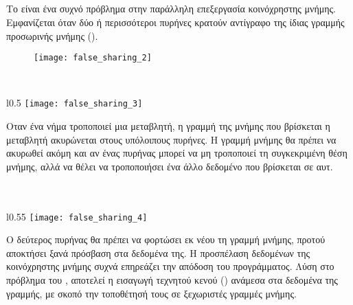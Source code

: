 \paragraph{}
\subparagraph{}
Το \emph{} είναι ένα συχνό πρόβλημα στην παράλληλη επεξεργασία κοινόχρηστης μνήμης. Εμφανίζεται όταν δύο ή περισσότεροι πυρήνες κρατούν αντίγραφο της ίδιας γραμμής προσωρινής μνήμης (\emph{}). 

\begin{figure}[h]
\texttt{[image: false\_sharing\_2]}
\centering
\captionsetup{justification=centering, singlelinecheck=false}
	\caption{}
\label{fig:false_sharing_2}
\end{figure}

\ \\
\begin{wrapfigure}{l}{0.5\textwidth}
	\centering
	\texttt{[image: false\_sharing\_3]}
	\captionsetup{justification=centering, singlelinecheck=false}
	\caption{}
\label{fig:false_sharing_3}
\end{wrapfigure}

Οταν ένα νήμα τροποποιεί μια μεταβλητή, η γραμμή της μνήμης που βρίσκεται η μεταβλητή ακυρώνεται στους υπόλοιπους πυρήνες. Η γραμμή μνήμης θα πρέπει να ακυρωθεί ακόμη και αν ένας πυρήνας μπορεί να μη τροποποιεί τη συγκεκριμένη θέση μνήμης, αλλά να θέλει να τροποποιήσει ένα άλλο δεδομένο που βρίσκεται σε αυτ. 
\ \\
\ \\
\ \\
\begin{wrapfigure}{l}{0.55\textwidth}
	\centering
	\texttt{[image: false\_sharing\_4]}
	\captionsetup{justification=centering, singlelinecheck=false}
	\caption{}
\label{fig:false_sharing_4}
\end{wrapfigure}

Ο δεύτερος πυρήνας θα πρέπει να φορτώσει εκ νέου τη γραμμή μνήμης, προτού αποκτήσει ξανά πρόσβαση στα δεδομένα της. Η προσπέλαση δεδομένων της κοινόχρηστης μνήμης συχνά επηρεάζει την απόδοση του προγράμματος\cite{false_sharing}.
Λύση στο πρόβλημα του , αποτελεί η εισαγωγή τεχνητού κενού () ανάμεσα στα δεδομένα της γραμμής, με σκοπό την τοποθέτησή τους σε ξεχωριστές γραμμές μνήμης.
\clearpage
